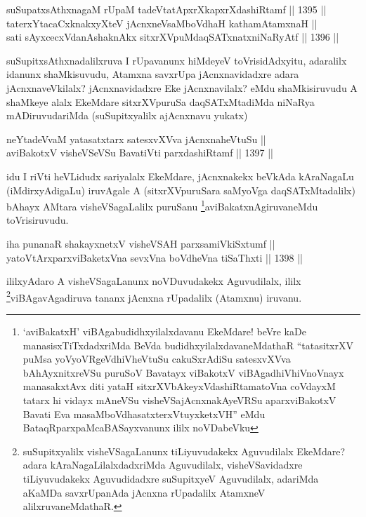 \begin{shl}
suSupatxsAthxnagaM rUpaM tadeVtatApxrXkapxrXdashiRtamf \hfill || 1395 ||  \\
taterxYtacaCxknakxyXteV jAcnxneV\s saMboVdhaH kathamAtamxnaH || \\
sati sAyxcecxVdanAshaknAkx sitxrXVpuMdaqSATxnatxniNaRyAtf \hfill || 1396 ||  
\end{shl}

\begin{artha}
suSupitxsAthxnadalilxruva I rUpavanunx hiMdeyeV toVrisidAdxyitu, adaralilx idanunx shaMkisuvudu, Atamxna savxrUpa jAcnxnavidadxre adara jAcnxnaveVkilalx? jAcnxnavidadxre Eke jAcnxnavilalx? eMdu shaMkisiruvudu A shaMkeye alalx EkeMdare sitxrXVpuruSa daqSATxMtadiMda niNaRya mADiruvudariMda (suSupitxyalilx ajAcnxnavu yukatx)
\end{artha}


\begin{shl}
neYtadeVvaM yatasatxtarx satesxvXVva jAcnxnaheVtuSu || \\
aviBakotxV visheVSeVSu BavatiVti parxdashiRtamf \hfill || 1397 ||  
\end{shl}

\begin{artha}
idu I riVti heVLidudx sariyalalx EkeMdare, jAcnxnakekx beVkAda kAraNagaLu (iMdirxyAdigaLu) iruvAgale A (sitxrXVpuruSara saMyoVga daqSATxMtadalilx) bAhayx AMtara visheVSagaLalilx puruSanu \footnote{`aviBakatxH' viBAgabudidhxyilalxdavanu EkeMdare! beVre kaDe manasisxTiTxdadxriMda BeVda budidhxyilalxdavaneMdathaR ``tatasitxrXV puMsa yoVyoVRgeVdhiVheVtuSu cakuSxrAdiSu satesxvXVva bAhAyxnitxreVSu puruSoV Bavatayx viBakotxV viBAgadhiVhiVnoV\s nayx manasakxtAvx diti yataH sitxrXVbAkeyxVdashiRtamatoVna coVdayxM tatarx hi vidayx mAneVSu visheVSajAcnxnakAyeVRSu aparxviBakotxV Bavati Eva masaMboVdhasatxterxVtuyxketxVH'' eMdu BataqRparxpaMcaBASayxvanunx ililx noVDabeVku}aviBakatxnAgiruvaneMdu toVrisiruvudu.
\end{artha}

\begin{shl}
iha punanaR shakayxnetxV visheVSAH parxsamiVkiSxtumf || \\
yatoV\s tArxparxviBaketxVna sevxVna boVdheVna tiSaThxti \hfill || 1398 ||  
\end{shl}

\begin{artha}
ililxyAdaro A visheVSagaLanunx noVDuvudakekx Aguvudilalx, ililx \footnote{suSupitxyalilx visheVSagaLanunx tiLiyuvudakekx Aguvudilalx EkeMdare? adara kAraNagaLilalxdadxriMda Aguvudilalx, visheVSavidadxre tiLiyuvudakekx Aguvudidadxre suSupitxyeV Aguvudilalx, adariMda aKaMDa savxrUpanAda jAcnxna rUpadalilx AtamxneV alilxruvaneMdathaR.}viBAgavAgadiruva tananx jAcnxna rUpadalilx (Atamxnu) iruvanu.
\end{artha}

